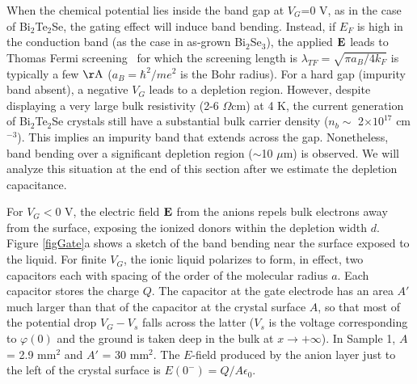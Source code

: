 
When the chemical potential lies inside the band gap at $V_G$=0 V, as in the case of Bi$_2$Te$_2$Se, the gating effect will induce band bending. Instead, if $E_F$ is high in the conduction band (as the case in as-grown Bi$_2$Se$_3$), the applied $\bf E$
leads to Thomas Fermi screening~\cite{Ashcroft} for which the screening length is
$\lambda_{TF} = \sqrt{\pi a_B/4k_F}$ is typically a few $\rm \AA$ ($a_B = \hbar^2/me^2$ is the Bohr radius).
For a hard gap (impurity band absent), a negative $V_G$ leads to a depletion region.
However, despite displaying a very large
bulk resistivity (2-6 $\Omega$cm) at 4 K, the current generation of Bi$_2$Te$_2$Se crystals still have a substantial
bulk carrier density ($n_b\sim$ 2$\times 10^{17}$ cm$^{-3}$). This implies an impurity band that extends across the gap.
Nonetheless, band bending over a significant depletion region ($\sim$10 $\mu$m) is observed.
We will analyze this situation at the end of this section after we estimate the depletion capacitance.


For $V_G < 0$ V, the electric field $\bf E$ from the anions repels bulk electrons away from the surface,
exposing the ionized donors within the depletion width $d$. 
Figure \ref{figGate}a shows a sketch of the band bending near the surface exposed to the liquid.
For finite $V_G$, the ionic liquid polarizes to form, in effect, two capacitors each with
spacing of the order of the molecular radius $a$. Each capacitor stores the charge $Q$. 
The capacitor at the gate electrode 
has an area $A'$ much larger than that of the capacitor at the crystal surface $A$, so that
most of the potential drop $V_G-V_s$ falls across the latter ($V_s$ is the voltage 
corresponding to $\varphi(0)$ and the ground is taken deep in the bulk at $x\to +\infty$).
In Sample 1, $A$ = 2.9 mm$^2$ and $A'$ = 30 mm$^2$. 
The $E$-field produced by the anion layer just to the left of the crystal surface is 
$E(0^-) = Q/A\epsilon_0$.


